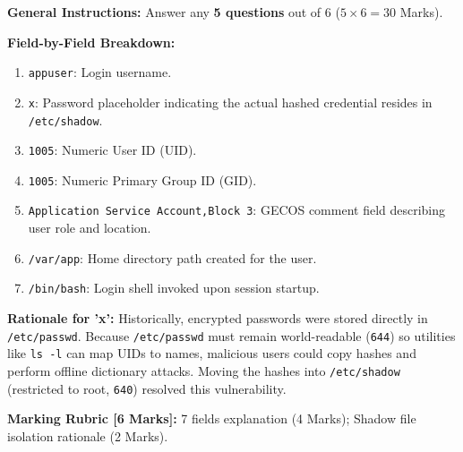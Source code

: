 
\begin{markingrubric}
\textbf{General Instructions:} Answer any \textbf{5 questions} out of 6 ($5 \times 6 = 30$ Marks).
\end{markingrubric}


\begin{examsol}
\textbf{Field-by-Field Breakdown:}
\begin{enumerate}[leftmargin=1.5em]
    \item \texttt{appuser}: Login username.
    \item \texttt{x}: Password placeholder indicating the actual hashed credential resides in \texttt{/etc/shadow}.
    \item \texttt{1005}: Numeric User ID (UID).
    \item \texttt{1005}: Numeric Primary Group ID (GID).
    \item \texttt{Application Service Account,Block 3}: GECOS comment field describing user role and location.
    \item \texttt{/var/app}: Home directory path created for the user.
    \item \texttt{/bin/bash}: Login shell invoked upon session startup.
\end{enumerate}
\textbf{Rationale for 'x':} Historically, encrypted passwords were stored directly in \texttt{/etc/passwd}. Because \texttt{/etc/passwd} must remain world-readable (\texttt{644}) so utilities like \texttt{ls -l} can map UIDs to names, malicious users could copy hashes and perform offline dictionary attacks. Moving the hashes into \texttt{/etc/shadow} (restricted to root, \texttt{640}) resolved this vulnerability.

\begin{markingrubric}
\textbf{Marking Rubric [6 Marks]:} 7 fields explanation (4 Marks); Shadow file isolation rationale (2 Marks).
\end{markingrubric}
\end{examsol}


